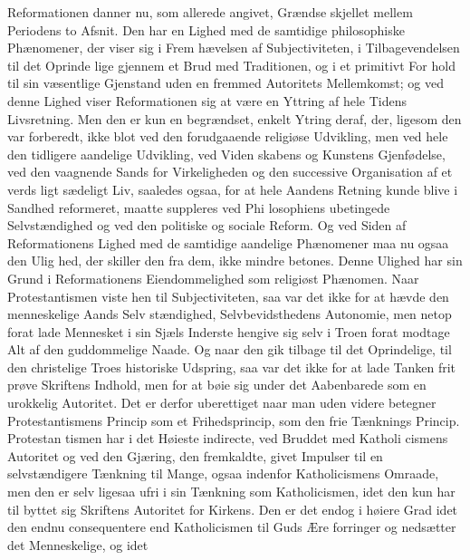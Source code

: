 \documentclass[12pt,a4paper]{book}
\begin{document}
Reformationen danner nu, som allerede angivet, Grændse\-%
skjellet mellem Periodens to Afsnit. Den har en Lighed med
de samtidige philosophiske Phænomener, der viser sig i Frem\-%
hævelsen af Subjectiviteten, i Tilbagevendelsen til det Oprinde\-%
lige gjennem et Brud med Traditionen, og i et primitivt For\-%
hold til sin væsentlige Gjenstand uden en fremmed Autoritets
Mellemkomst; og ved denne Lighed viser Reformationen sig
at være en Yttring af hele Tidens Livsretning. Men den er
kun en begrændset, enkelt Ytring deraf, der, ligesom den var
forberedt, ikke blot ved den forudgaaende religiøse Udvikling,
men ved hele den tidligere aandelige Udvikling, ved Viden\-%
skabens og Kunstens Gjenfødelse, ved den vaagnende Sands
for Virkeligheden og den successive Organisation af et verds\-%
ligt sædeligt Liv, saaledes ogsaa, for at hele Aandens Retning
kunde blive i Sandhed reformeret, maatte suppleres ved Phi\-%
losophiens ubetingede Selvstændighed og ved den politiske og
sociale Reform. Og ved Siden af Reformationens Lighed med
de samtidige aandelige Phænomener maa nu ogsaa den Ulig\-%
hed, der skiller den fra dem, ikke mindre betones. Denne Ulighed
har sin Grund i Reformationens Eiendommelighed som religiøst
Phænomen. Naar Protestantismen viste hen til Subjectiviteten,
saa var det ikke for at hævde den menneskelige Aands Selv\-%
stændighed, Selvbevidsthedens Autonomie, men netop forat lade
Mennesket i sin Sjæls Inderste hengive sig selv i Troen forat
modtage Alt af den guddommelige Naade. Og naar den gik
tilbage til det Oprindelige, til den christelige Troes historiske
Udspring, saa var det ikke for at lade Tanken frit prøve
Skriftens Indhold, men for at bøie sig under det Aabenbarede
som en urokkelig Autoritet. Det er derfor uberettiget naar
man uden videre betegner Protestantismens Princip som et
Frihedsprincip, som den frie Tænknings Princip. Protestan\-%
tismen har i det Høieste indirecte, ved Bruddet med Katholi\-%
cismens Autoritet og ved den Gjæring, den fremkaldte, givet
Impulser til en selvstændigere Tænkning til Mange, ogsaa
indenfor Katholicismens Omraade, men den er selv ligesaa
ufri i sin Tænkning som Katholicismen, idet den kun har til\-%
byttet sig Skriftens Autoritet for Kirkens. Den er det endog
i høiere Grad idet den endnu consequentere end Katholicismen
til Guds Ære forringer og nedsætter det Menneskelige, og idet
\end{document}
